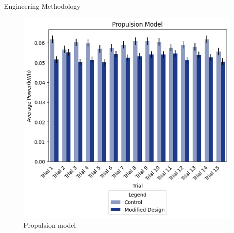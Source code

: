 \documentclass[final, 16pt]{beamer}
\newlength{\colwidth}
\newlength{\twocolwidth}
\begin{document}
\begin{frame}[t]
\begin{columns}[t]
\begin{column}{\twocolwidth}
\begin{block}{Engineering Methodology}
\begin{minipage}[t]{0.48\linewidth}
\begin{multicols}{2}
\begin{figure}[H]
          \includegraphics[width=1.05\linewidth, height=1.25\linewidth]{img/Propulsion_Model_Benchmark.png}
          \caption{Propulsion model}
          \label{fig:propulsion-model-benchmark}
        \end{figure}
        

\end{multicols}
\end{minipage}
\end{block}
\end{column}
\end{columns}
\end{frame}
\end{document}

